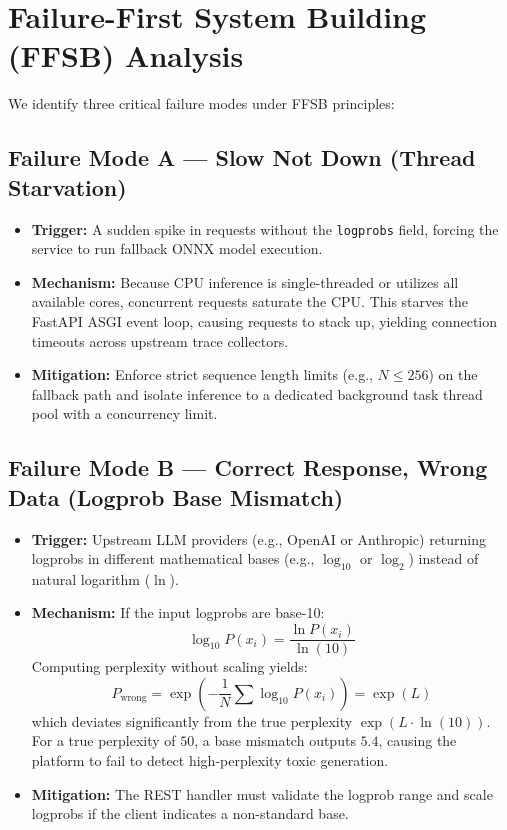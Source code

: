 \documentclass[10pt]{article}
\begin{document}
\section{Failure-First System Building (FFSB) Analysis}
We identify three critical failure modes under FFSB principles:

\subsection{Failure Mode A --- Slow Not Down (Thread Starvation)}
\begin{itemize}
\item \textbf{Trigger:} A sudden spike in requests without the \texttt{logprobs} field, forcing the service to run fallback ONNX model execution.
\item \textbf{Mechanism:} Because CPU inference is single-threaded or utilizes all available cores, concurrent requests saturate the CPU. This starves the FastAPI ASGI event loop, causing requests to stack up, yielding connection timeouts across upstream trace collectors.
\item \textbf{Mitigation:} Enforce strict sequence length limits (e.g., $N \le 256$) on the fallback path and isolate inference to a dedicated background task thread pool with a concurrency limit.
\end{itemize}

\subsection{Failure Mode B --- Correct Response, Wrong Data (Logprob Base Mismatch)}
\begin{itemize}
\item \textbf{Trigger:} Upstream LLM providers (e.g., OpenAI or Anthropic) returning logprobs in different mathematical bases (e.g., $\log_{10}$ or $\log_2$) instead of natural logarithm ($\ln$).
\item \textbf{Mechanism:} If the input logprobs are base-10:
  \begin{equation}
  \log_{10} P(x_i) = \frac{\ln P(x_i)}{\ln(10)}
  \end{equation}
  Computing perplexity without scaling yields:
  \begin{equation}
  P_{\text{wrong}} = \exp\left( - \frac{1}{N} \sum \log_{10} P(x_i) \right) = \exp(L)
  \end{equation}
  which deviates significantly from the true perplexity $\exp(L \cdot \ln(10))$. For a true perplexity of $50$, a base mismatch outputs $5.4$, causing the platform to fail to detect high-perplexity toxic generation.
\item \textbf{Mitigation:} The REST handler must validate the logprob range and scale logprobs if the client indicates a non-standard base.
\end{itemize}
\end{document}
